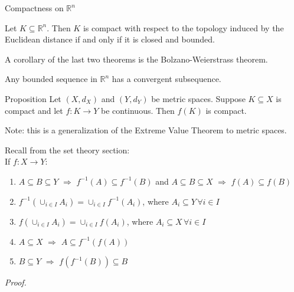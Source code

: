 \documentclass [aspectratio=169]{beamer}
\newcommand{\R}{{\mathbb{R}}}
\newcommand{\inv}{{-1}}
\begin{document}
\begin{frame}{Compactness on $\R^n$}
\begin{theorem}
Let $K\subseteq \R^n$. Then $K$ is compact with respect to the topology induced by the Euclidean distance if and only if it is closed and bounded.
\end{theorem}

\vspace{1em}

A corollary of the last two theorems is the Bolzano-Weierstrass theorem.

\begin{corollary}
Any bounded sequence in $\R^n$ has a convergent subsequence.
\end{corollary}
\end{frame}


\begin{frame}
\vspace{1em}
\begin{exampleblock}{Proposition}
Let $(X,d_X)$ and $(Y, d_Y)$ be metric spaces. Suppose $K\subseteq X$ is compact and let $f\colon K \to Y$ be continuous. Then $f(K)$ is compact. 
\end{exampleblock}

Note: this is a generalization of the Extreme Value Theorem to metric spaces.

\vspace{1em}

Recall from the set theory section: \\
If $f:X \to Y$:
\begin{enumerate}
\item $A \subseteq B \subseteq Y$ $\Rightarrow$ $f^{-1}(A) \subseteq f^{-1}(B)$ and  $A \subseteq B \subseteq X$ $\Rightarrow$ $f(A) \subseteq f(B)$
\item $f^\inv(\cup_{i \in I}A_i) = \cup_{i \in I}f^\inv(A_i)$, where $A_i \subseteq Y \, \forall i \in I$
\item $f(\cup_{i \in I}A_i) = \cup_{i \in I}f(A_i)$, where $A_i \subseteq X \, \forall i \in I$
\item $A \subseteq X$ $\Rightarrow$  $A \subseteq f^{-1}(f(A))$
\item $B \subseteq Y$ $\Rightarrow$   $f(f^{-1}(B)) \subseteq B$
\end{enumerate}

\end{frame}

\begin{frame}
\textit{Proof.}
\vspace{7cm}
\end{frame}
\end{document}
